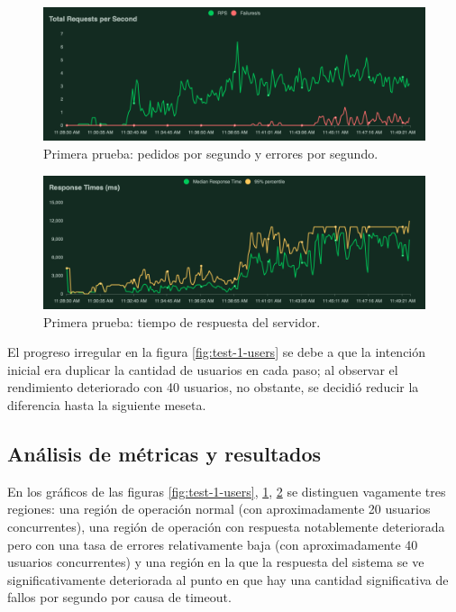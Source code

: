 \documentclass[11pt]{scrartcl}
\begin{document}
\begin{figure}
\centering
\includegraphics[scale=0.44]{img/requests-per-second}
\caption{Primera prueba: pedidos por segundo y errores por segundo.}
\label{fig:test-1-requests-per-second}
\end{figure}

\begin{figure}
\centering
\includegraphics[scale=0.44]{img/response-times}
\caption{Primera prueba: tiempo de respuesta del servidor.}
\label{fig:test-1-response-times}
\end{figure}

El progreso irregular en la figura \ref{fig:test-1-users} se debe a que la intención inicial era duplicar la cantidad de usuarios en cada paso; al observar el rendimiento deteriorado con 40 usuarios, no obstante, se decidió reducir la diferencia hasta la siguiente meseta.

\subsection{Análisis de métricas y resultados}

En los gráficos de las figuras \ref{fig:test-1-users}, \ref{fig:test-1-requests-per-second}, \ref{fig:test-1-response-times} se distinguen vagamente tres regiones: una región de operación normal (con aproximadamente 20 usuarios concurrentes), una región de operación con respuesta notablemente deteriorada pero con una tasa de errores relativamente baja (con aproximadamente 40 usuarios concurrentes) y una región en la que la respuesta del sistema se ve significativamente deteriorada al punto en que hay una cantidad significativa de fallos por segundo por causa de timeout.
\end{document}
